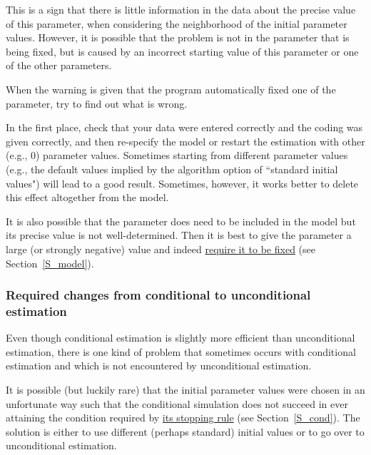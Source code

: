 \documentclass[a4paper,fleqn,11pt]{article}
\newcommand{\+}{\, + \,}
\begin{document}
This is a sign that there is little information in the data about
the precise value of this parameter, when considering the
neighborhood of the initial parameter values. However, it is
possible that the problem is not in the parameter that is being
fixed, but is caused by an incorrect starting value of this
parameter or one of the other parameters.

When the warning is given that the program automatically fixed one
of the parameter, try to find out what is wrong.

In the first place, check that your data were entered correctly
and the coding was given correctly, and then re-specify the model
or restart the estimation with other (e.g., 0) parameter values.
Sometimes starting from different parameter values (e.g., the
default values implied by the algorithm option
of ``standard initial values") will lead to a good result.
Sometimes, however, it works better to delete this effect
altogether from the model.

It is also possible that the parameter does need to be included in
the model but its precise value is not well-determined. Then it is
best to give the parameter a large (or strongly negative) value
and indeed
\hyperlink{T_fix}{require it to be fixed}
(see Section~\ref{S_model}).


\subsubsection{Required changes from conditional to unconditional estimation}

Even though conditional estimation is slightly more efficient than
unconditional estimation, there is one kind of problem that
sometimes occurs with conditional estimation and which is not
encountered by unconditional estimation.

It is possible (but luckily rare) that the initial parameter
values were chosen in an unfortunate way such that the conditional
simulation does not succeed in ever attaining the condition required
by \hyperlink{T_distance_stop}{its stopping rule} (see
Section~\ref{S_cond}).
The solution is either to use different
(perhaps standard) initial values or to go over to
unconditional estimation.
\end{document}
